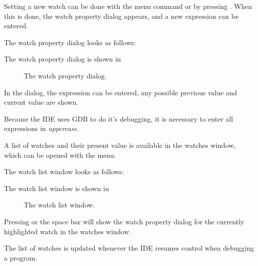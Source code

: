 Setting a new watch can be done with the  menu 
command or by pressing . When this is done, the watch
property dialog appears, and a new expression can be entered.
\begin{htmlonly}
The watch property dialog looks as follows:
\end{htmlonly}
\begin{latexonly}
The watch property dialog is shown in 
\begin{figure}[ht]
\caption{The watch property dialog.}\label{fig:watch}
\ifpdf
{}
\else
{}
\fi
\end{figure}
\end{latexonly}
In the dialog, the expression can be entered, any possible previous value
and current value are shown.
\begin{remark}
Because the IDE uses GDB to do it's debugging, it is necessary to enter all
expressions in {\em uppercase}. 
\end{remark}
A list of watches and their present value is available in the watches
window, which can be opened with the  menu.
\begin{htmlonly}
The watch list window looks as follows:
\end{htmlonly}
\begin{latexonly}
The watch list window is shown in 
\begin{figure}[ht]
\caption{The watch list window.}\label{fig:watchlst}
\ifpdf
{}
\else
{}
\fi
\end{figure}
\end{latexonly}

Pressing  or the space bar will show the watch property dialog
for the currently highlighted watch in the watches window.

The list of watches is updated whenever the IDE resumes control when
debugging a program.
%
%
